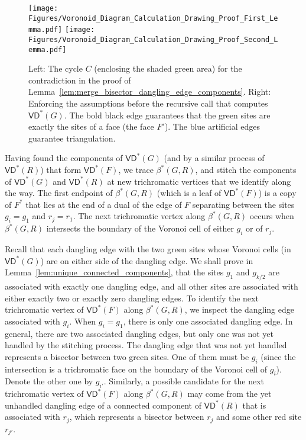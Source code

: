 \documentclass{article}
\newcommand{\VD}{\textsf{VD}}
\begin{document}
\begin{figure}[htb]
     \centering
    \texttt{[image: Figures/Voronoid\_Diagram\_Calculation\_Drawing\_Proof\_First\_Lemma.pdf]}
     \hspace{0.4in}\texttt{[image: Figures/Voronoid\_Diagram\_Calculation\_Drawing\_Proof\_Second\_Lemma.pdf]}
     \caption{Left: The cycle $C$ (enclosing the shaded green area) for the contradiction in the proof of Lemma~\ref{lem:merge_bisector_dangling_edge_components}. Right: Enforcing the assumptions before the recursive call that computes $\VD^*(G)$. The bold black edge guarantees that the green sites are exactly the sites of a face (the face $F'$). The blue artificial edges guarantee triangulation.}
     \label{fig:Voronoid_Diagram_Calculation_Drawing_Proof_First_Lemma}
 \end{figure}

Having found the components of $\VD^*(G)$ (and by a similar process of $\VD^*(R)$) that form $\VD^*(F)$, we trace $\beta^*(G,R)$, and stitch the components of $\VD^*(G)$ and $\VD^*(R)$ at new trichromatic vertices that we identify along the way.
The first endpoint of $\beta^*(G,R)$ (which is a leaf of $\VD^*(F)$) is a copy of $F^*$ that lies at the end of a dual of the edge of $F$ separating between the sites $g_i=g_1$ and $r_j = r_1$.
The next trichromatic vertex along $\beta^*(G,R)$ occurs when $\beta^*(G,R)$ intersects  the boundary of the Voronoi cell of either $g_i$ or of $r_j$.

Recall that each dangling edge with the two green sites whose Voronoi cells (in $\VD^*(G)$) are on either side of the dangling edge. We shall prove in Lemma~\ref{lem:unique_connected_components},
that the sites $g_1$ and $g_{k/2}$ are associated with exactly one dangling edge, and all other sites are associated with either exactly two or exactly zero dangling edges.
To identify the next trichromatic vertex of $\VD^*(F)$ along $\beta^*(G,R)$, we inspect the dangling edge associated with $g_i$. When $g_i=g_1$, there is only one associated dangling edge. In general, there are two associated dangling edges, but only one was not yet handled by the stitching process.
 The dangling edge that was not yet handled represents a bisector between two green sites. One of them must be $g_i$ (since the intersection is a trichromatic face on the boundary of the Voronoi cell of $g_i$).
Denote the other one by $g_{i'}$. Similarly, a possible candidate for the next trichromatic vertex of $\VD^*(F)$ along $\beta^*(G,R)$ may come from the yet unhandled dangling edge of a connected component of $\VD^*(R)$ that is associated with $r_j$, which represents a bisector between $r_j$ and some other red site $r_{j'}$.
\end{document}

